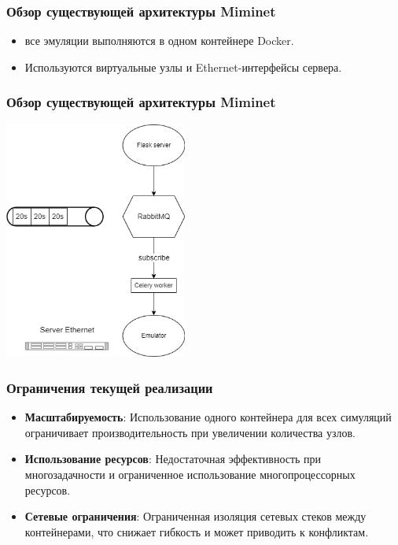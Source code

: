 \documentclass{beamer}
\begin{document}
\begin{frame}[fragile]
  \frametitle{Обзор существующей архитектуры Miminet}
  \begin{itemize}
    \item все эмуляции выполняются в одном контейнере Docker.
    \item Используются виртуальные узлы и Ethernet-интерфейсы сервера.
  \end{itemize}
\end{frame}

\begin{frame}[fragile]
  \frametitle{Обзор существующей архитектуры Miminet}
  \begin{center}
    \includegraphics[width=0.45\textwidth, keepaspectratio]{seq.png}
  \end{center}
\end{frame}


\begin{frame}[fragile]
  \frametitle{Ограничения текущей реализации}
  \begin{itemize}
    \item \textbf{Масштабируемость}: Использование одного контейнера для всех симуляций ограничивает производительность при увеличении количества узлов.
    \item \textbf{Использование ресурсов}: Недостаточная эффективность при многозадачности и ограниченное использование многопроцессорных ресурсов.
    \item \textbf{Сетевые ограничения}: Ограниченная изоляция сетевых стеков между контейнерами, что снижает гибкость и может приводить к конфликтам.
  \end{itemize}
\end{frame}
\end{document}
